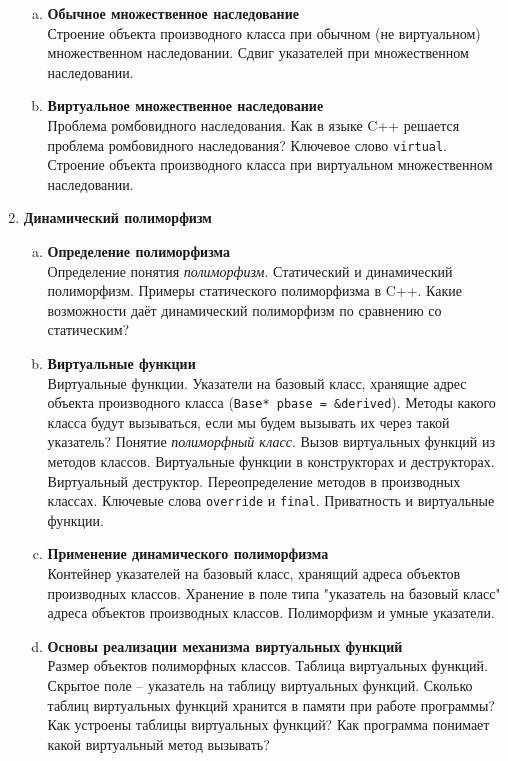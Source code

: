 \documentclass{article}
\begin{document}
\begin{enumerate}
\begin{enumerate}[a.]
\item \textbf{Обычное множественное наследование}\\
Строение объекта производного класса при обычном (не виртуальном) множественном наследовании. Сдвиг указателей при множественном наследовании. 

\item \textbf{Виртуальное множественное наследование}\\
Проблема ромбовидного наследования. Как в языке C++ решается проблема ромбовидного наследования? Ключевое слово \texttt{virtual}. Строение объекта производного класса при виртуальном множественном наследовании.
\end{enumerate}




\item \textbf{Динамический полиморфизм}
\begin{enumerate}[a.]


\item \textbf{Определение полиморфизма}\\
Определение понятия \textit{полиморфизм}. Статический и динамический полиморфизм. Примеры статического полиморфизма в C++. Какие возможности даёт динамический полиморфизм по сравнению со статическим?

\item \textbf{Виртуальные функции}\\
Виртуальные функции. Указатели на базовый класс, хранящие адрес объекта производного класса (\texttt{Base* pbase = \&derived}). Методы какого класса будут вызываться, если мы будем вызывать их через такой указатель? Понятие \textit{полиморфный класс}.  Вызов виртуальных функций из методов классов. Виртуальные функции в конструкторах и деструкторах. Виртуальный деструктор. Переопределение методов в производных классах. Ключевые слова \texttt{override} и \texttt{final}. Приватность и виртуальные функции. 

\item \textbf{Применение динамического полиморфизма}\\
Контейнер указателей на базовый класс, хранящий адреса объектов производных классов. Хранение в поле типа "указатель на базовый класс" адреса объектов производных классов. Полиморфизм и умные указатели.

\item \textbf{Основы реализации механизма виртуальных функций}\\
Размер объектов полиморфных классов. Таблица виртуальных функций. Скрытое поле -- указатель на таблицу виртуальных функций. Сколько таблиц виртуальных функций хранится в памяти при работе программы? Как устроены таблицы виртуальных функций? Как программа понимает какой виртуальный метод вызывать?


\end{enumerate}
\end{enumerate}
\end{document}

